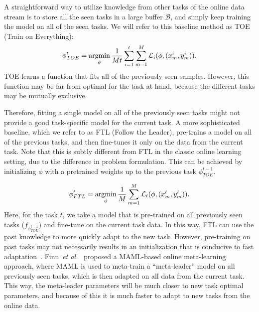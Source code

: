 A straightforward way to utilize knowledge from other tasks of the online data stream is to store all the seen tasks in a large buffer $\mathcal{B}$, and simply keep training the model on all of the seen tasks. We will refer to this baseline method as TOE (Train on Everything):
\begin{align*}
    \phi^t_{TOE} = \operatorname*{argmin}_{\phi} \frac{1}{Mt}\sum_{i=1}^t \sum_{m=1}^M  \mathcal{L}_{i}(\phi, (x^i_m, y^i_m)).
\end{align*}
TOE learns a function that fits all of the previously seen samples. However, this function may be far from optimal for the task at hand, because the different tasks may be mutually exclusive.

Therefore, fitting a single model on all of the previously seen tasks might not provide a good task-specific model for the current task. A more sophisticated baseline, which we refer to as FTL (Follow the Leader), pre-trains a model on all of the previous tasks, and then fine-tunes it only on the data from the current task. Note that this is subtly different from FTL in the classic online learning setting, due to the difference in problem formulation. This can be achieved by initializing $\phi$ with a pretrained weights up to the previous task $\phi^{t-1}_{TOE}$.

\begin{align*}
    \phi^t_{FTL} = \operatorname*{argmin}_{\phi} \frac{1}{M}\sum_{m=1}^M \mathcal{L}_{t}(\phi, (x^t_m, y^t_m)).
\end{align*}
Here, for the task $t$, we take a model that is pre-trained on all previously seen tasks ($f_{\phi^{t-1}_{TOE}}$) and fine-tune on the current task data. In this way, FTL can use the past knowledge to more quickly adapt to the new task. However, pre-training on past tasks may not necessarily results in an initialization that is conducive to fast adaptation~\citep{finn2017model, nichol2018first, nichol2018reptile, li2017meta}. Finn~\emph{et al.}~\citep{finn19a} proposed a MAML-based online meta-learning approach, where MAML is used to meta-train a ``meta-leader'' model on all previously seen tasks, which is then adapted on all data from the current task. This way, the meta-leader parameters will be much closer to new task optimal parameters, and because of this it is much faster to adapt to new tasks from the online data.

